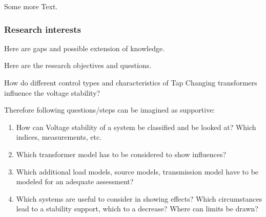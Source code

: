 \lipsum[2]
Some more Text.

\lipsum[3]

\clearpage

\subsubsection{Research interests}

Here are gaps and possible extension of knowledge.

Here are the research objectives and questions.


\begin{tcolorbox}[float, colback=ees_blue!5!white,colframe=ees_blue!75!black, toptitle=1mm, bottomtitle=1mm, left=2mm, right=2.5mm, top=2mm, bottom=2mm, title={\textbf{Research question of this thesis}}]
    How do different control types and characteristics of Tap Changing transformers influence the voltage stability?
\end{tcolorbox}

Therefore following questions/steps can be imagined as supportive:
\begin{enumerate}
    \item How can Voltage stability of a system be classified and be looked at? Which indices, measurements, etc.
    \item Which transformer model has to be considered to show influences?
    \item Which additional load models, source models, transmission model have to be modeled for an adequate assessment?
    \item Which systems are useful to consider in showing effects? Which circumstances lead to a stability support, which to a decrease? Where can limits be drawn?
\end{enumerate}


